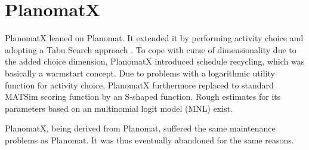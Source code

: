
\section{PlanomatX}

PlanomatX leaned on Planomat. It extended it by performing activity choice and adopting a Tabu Search approach \citep[][]{Feil_PhDThesis_2010}. To cope with curse of dimensionality due to the added choice dimension, PlanomatX introduced schedule recycling, which was basically a warmstart concept. Due to problems with a logarithmic utility function for activity choice, PlanomatX furthermore replaced to standard MATSim scoring function by an S-shaped function. Rough estimates for its parameters based on an multinomial logit model (MNL) exist. 


PlanomatX, being derived from Planomat, suffered the same maintenance problems as Planomat.  It was thus eventually abandoned for the same reasons.





